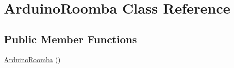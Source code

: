\hypertarget{class_arduino_roomba}{
\section{ArduinoRoomba Class Reference}
\label{class_arduino_roomba}
}
\subsection*{Public Member Functions}
\begin{DoxyCompactItemize}
\item 
\hypertarget{class_arduino_roomba_af7d106ebf18714863cea529689689180}{
\hyperlink{class_arduino_roomba_af7d106ebf18714863cea529689689180}{ArduinoRoomba} ()}
\label{class_arduino_roomba_af7d106ebf18714863cea529689689180}


\end{DoxyCompactItemize}
